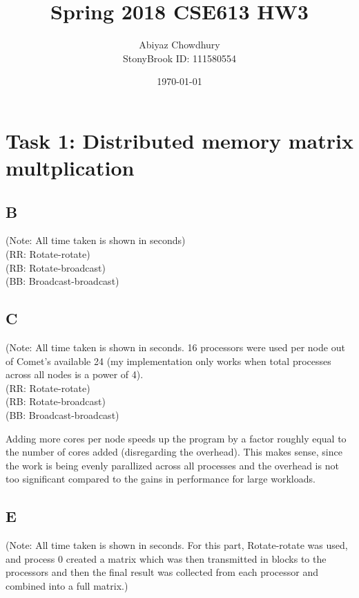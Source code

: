 \documentclass[a4paper]{article}
\title{\textbf{Spring 2018 CSE613 HW3}}
\author{Abiyaz Chowdhury\\ StonyBrook ID: 111580554}
\date{\today}
\begin{document}
\maketitle
\section*{Task 1: Distributed memory matrix multplication}
\subsection*{B}

(Note: All time taken is shown in seconds) \\
(RR: Rotate-rotate) \\
(RB: Rotate-broadcast) \\
(BB: Broadcast-broadcast) \\
\par
{}
  
\subsection*{C}

(Note: All time taken is shown in seconds. 16 processors were used per node out of Comet's available 24 (my implementation only works when total processes across all nodes is a power of 4). \\
(RR: Rotate-rotate) \\
(RB: Rotate-broadcast) \\
(BB: Broadcast-broadcast) \\
\par
{}
    
Adding more cores per node speeds up the program by a factor roughly equal to the number of cores added (disregarding the overhead). This makes sense, since the work is being evenly parallized across all processes and the overhead is not too significant compared to the gains in performance for large workloads.
    
\subsection*{E}
(Note: All time taken is shown in seconds. For this part, Rotate-rotate was used, and process 0 created a matrix which was then transmitted in blocks to the processors and then the final result was collected from each processor and combined into a full matrix.)
\end{document}
